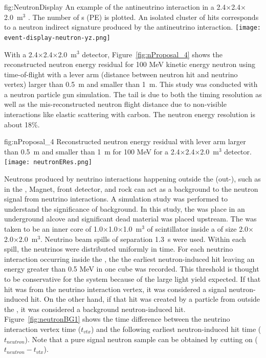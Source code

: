 \begin{dunefigure}{fig:NeutronDisplay}
{An example of the antineutrino
interaction in a 2.4$\times$2.4$\times$2.0~m$^{3}$ . 
The number of \phel{}s (PE) is plotted.
An isolated cluster of hits 
corresponds to a neutron indirect signature produced by the antineutrino interaction.}
  \texttt{[image: event-display-neutron-yz.png]}
\end{dunefigure}

With a 2.4$\times$2.4$\times$2.0~m$^{3}$  detector, Figure~\ref{fig:nProposal_4} shows 
the reconstructed neutron energy residual for 100 MeV kinetic energy neutron using time-of-flight with a lever arm (distance between neutron hit and neutrino vertex) larger than 0.5~m and smaller than 1~m.
This study was conducted with a neutron particle gun simulation.
The tail is due to both the timing resolution as well as the mis-reconstructed neutron flight distance due to non-visible interactions like elastic scattering with carbon.
The neutron energy resolution is about 18\%. \\
\begin{dunefigure}{fig:nProposal_4}
{Reconstructed neutron energy residual with lever arm larger than 0.5~m and smaller than 1~m for 100 MeV for a 2.4$\times$2.4$\times$2.0~m$^{3}$  detector.}
  \texttt{[image: neutronERes.png]}
\end{dunefigure}

 Neutrons produced by neutrino interactions happening outside the   (out-), such as in the , Magnet, front detector, and rock can act as a background to the neutron signal from neutrino interactions. 
A simulation study was performed to understand the significance of background. In this study, the  was place in an underground alcove and significant dead material was placed upstream.  The  was taken to be an inner core of 1.0$\times$1.0$\times$1.0~m$^{3}$ of scintillator inside a  of size 2.0$\times$2.0$\times$2.0~m$^{3}$.  Neutrino beam spills of separation 1.3~s were used.  Within each spill, the neutrinos were distributed uniformly in time.
For each neutrino interaction occurring inside the , the 
 the earliest neutron-induced hit leaving an energy greater than 0.5 MeV in one cube was recorded. This threshold is thought to be conservative for the  system because of the large light yield expected.  If that hit was from the neutrino interaction vertex, it was considered a signal neutron-induced hit. On the other hand, if that hit was created by a particle from outside the , it was considered a background neutron-induced hit.
Figure~\ref{fig:neutronBG1} shows the time difference between the neutrino interaction vertex time ($t_{vtx}$) and the following earliest neutron-induced hit time ($t_{neutron}$). 
Note that a pure signal neutron sample can be obtained by cutting on ($t_{neutron} - t_{vtx}$). 


